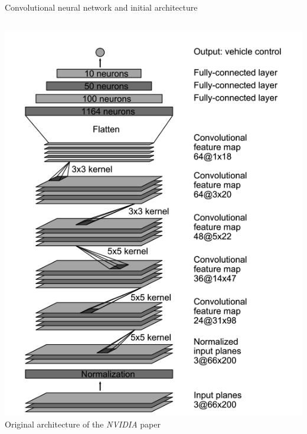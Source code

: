 \begin{frame}{Convolutional neural network and initial architecture}
\begin{columns}[c]
\begin{column}{0.4\textwidth}
			\includegraphics[width=\textwidth]{./imgs/NetworkOriginal.png}
			{\footnotesize Original architecture of the \textit{NVIDIA} paper \cite{NVIDIA2016}}
		\end{column}
	\end{columns}
\end{frame}

